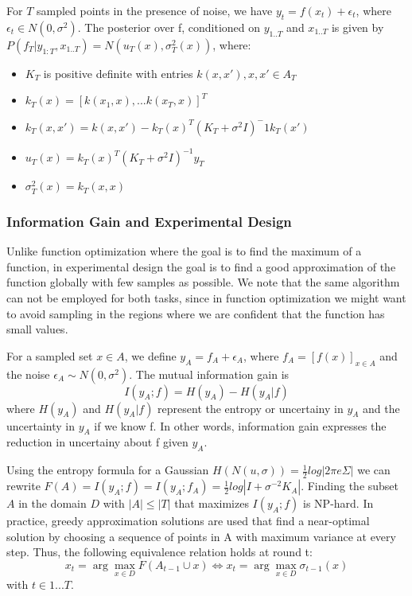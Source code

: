 \documentclass[10pt,journal,a4paper]{IEEEtran}
\begin{document}
For $T$ sampled points in the presence of noise, we have $y_t = f(x_t) + \epsilon_t$, where $\epsilon_t \in N(0,\sigma^2)$. The posterior over f, conditioned on $y_{1..T}$ and $x_{1..T}$ is given by
$P(f_T| y_{1:T},x_{1..T}) = N(u_T(x), \sigma_T^2(x))$, where: 
\begin{itemize}
	\item $K_T$ is positive definite with entries $k(x,x'), x,x' \in A_T$   
	\item $k_T(x) = [k(x_1,x),...k(x_T,x)]^T$	
	\item $k_{T}(x,x') = k(x,x') - k_T(x)^T(K_T+\sigma^2I)^-1k_T(x')$
	\item $u_{T}(x) = k_{T}(x)^{T}(K_T + \sigma^2I)^{-1} y_{T}$
	\item $\sigma_T^2(x) =  k_{T}(x,x)$
\end{itemize}

\subsubsection{Information Gain and Experimental Design}

Unlike function optimization where the goal is to find the maximum of a function, in experimental design the goal is to find a good approximation of the function globally with few samples as possible. We note that the same algorithm can not be employed for both tasks, since in function optimization we might want to avoid sampling in the regions where we are confident that the function has small values.

For a sampled set $x\in A$, we define $y_A = f_A + \epsilon_A$, where  $f_A=[f(x)]_{x \in A}$ and the noise $\epsilon_A \sim N(0,\sigma^2)$.
 The mutual information gain is
\begin{equation}
	I(y_A; f) = H(y_A) - H(y_A| f)
\end{equation}
where $H(y_A)$ and $H(y_A|f)$ represent the entropy or uncertainy in $y_A$ and 
the uncertainty in $y_A$ if we know f. In other words, information gain expresses the reduction in uncertainy about f given $y_A$.

Using the entropy formula for a Gaussian $H(N(u,\sigma)) =\frac{1}{2}log|2\pi e \Sigma|$ we can rewrite $F(A) =I(y_A; f)  = I(y_A; f_A) = \frac{1}{2} log|I + \sigma^{-2} K_A|$.
Finding the subset $A$ in the domain $D$ with $|A| \leq |T|$ that maximizes $I(y_A; f)$ is NP-hard. In practice, greedy approximation solutions are used that find a near-optimal solution by choosing a sequence of points in A with maximum variance at every step. Thus, the following equivalence relation holds at round t:
\begin{equation}
x_t = \arg\max_{x\in D} F(A_{t-1}\cup {x}) \Longleftrightarrow 
x_t = \arg\max_{x\in D}\sigma_{t-1}(x) 
\end{equation}
with $t\in{1...T}$.
\end{document}
